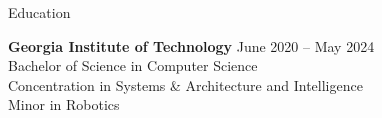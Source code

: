 \documentclass{resume} %
\begin{document}

\vspace{-0.5em}
\begin{rSection}{Education}

{\bf Georgia Institute of Technology} \hfill {June 2020 -- May 2024}\\
Bachelor of Science in Computer Science\\
Concentration in Systems \& Architecture and Intelligence\\
Minor in Robotics

\end{rSection}

\end{document}
